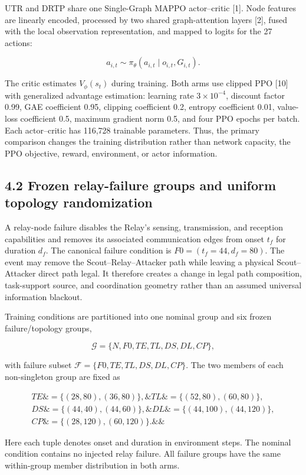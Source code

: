 UTR and DRTP share one Single-Graph MAPPO actor--critic [1]. Node features are linearly encoded, processed by two shared graph-attention layers [2], fused with the local observation representation, and mapped to logits for the 27 actions:

\[
a_{i,t}\sim\pi_\theta(a_{i,t}\mid o_{i,t},G_{i,t}).
\]

The critic estimates \(V_\phi(s_t)\) during training. Both arms use clipped PPO [10] with generalized advantage estimation: learning rate \(3\times10^{-4}\), discount factor 0.99, GAE coefficient 0.95, clipping coefficient 0.2, entropy coefficient 0.01, value-loss coefficient 0.5, maximum gradient norm 0.5, and four PPO epochs per batch. Each actor--critic has 116,728 trainable parameters. Thus, the primary comparison changes the training distribution rather than network capacity, the PPO objective, reward, environment, or actor information.

\subsection{4.2 Frozen relay-failure groups and uniform topology randomization}

A relay-node failure disables the Relay's sensing, transmission, and reception capabilities and removes its associated communication edges from onset \(t_f\) for duration \(d_f\). The canonical failure condition is \(F0=(t_f=44,d_f=80)\). The event may remove the Scout--Relay--Attacker path while leaving a physical Scout--Attacker direct path legal. It therefore creates a change in legal path composition, task-support source, and coordination geometry rather than an assumed universal information blackout.

Training conditions are partitioned into one nominal group and six frozen failure/topology groups,

\[
\mathcal G=\{N,F0,TE,TL,DS,DL,CP\},
\]

with failure subset \(\mathcal F=\{F0,TE,TL,DS,DL,CP\}\). The two members of each non-singleton group are fixed as

\[
\begin{aligned}
TE\&=\{(28,80),(36,80)\}, \& TL\&=\{(52,80),(60,80)\},\\
DS\&=\{(44,40),(44,60)\}, \& DL\&=\{(44,100),(44,120)\},\\
CP\&=\{(28,120),(60,120)\}. \&\&
\end{aligned}
\]

Here each tuple denotes onset and duration in environment steps. The nominal condition contains no injected relay failure. All failure groups have the same within-group member distribution in both arms.

